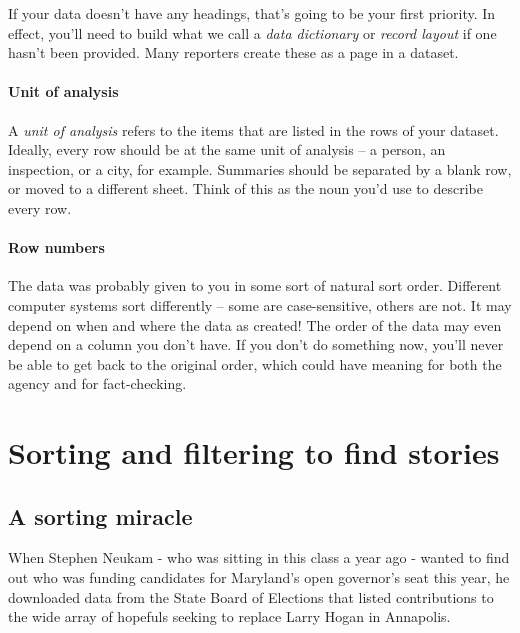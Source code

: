 \documentclass[
  letterpaper,
  DIV=11,
  numbers=noendperiod]{scrreprt}
\begin{document}
If your data doesn't have any headings, that's going to be your first
priority. In effect, you'll need to build what we call a \emph{data
dictionary} or \emph{record layout} if one hasn't been provided. Many
reporters create these as a page in a dataset.

\hypertarget{unit-of-analysis}{%
\subsubsection{Unit of analysis}\label{unit-of-analysis}}

A \emph{unit of analysis} refers to the items that are listed in the
rows of your dataset. Ideally, every row should be at the same unit of
analysis -- a person, an inspection, or a city, for example. Summaries
should be separated by a blank row, or moved to a different sheet. Think
of this as the noun you'd use to describe every row.

\hypertarget{row-numbers}{%
\subsubsection{Row numbers}\label{row-numbers}}

The data was probably given to you in some sort of natural sort order.
Different computer systems sort differently -- some are case-sensitive,
others are not. It may depend on when and where the data as created! The
order of the data may even depend on a column you don't have. If you
don't do something now, you'll never be able to get back to the original
order, which could have meaning for both the agency and for
fact-checking.


\hypertarget{sorting-and-filtering-to-find-stories}{%
\chapter{Sorting and filtering to find
stories}\label{sorting-and-filtering-to-find-stories}}

\hypertarget{a-sorting-miracle}{%
\section{A sorting miracle}\label{a-sorting-miracle}}

When Stephen Neukam - who was sitting in this class a year ago - wanted
to find out who was funding candidates for Maryland's open governor's
seat this year, he downloaded data from the State Board of Elections
that listed contributions to the wide array of hopefuls seeking to
replace Larry Hogan in Annapolis.
\end{document}
